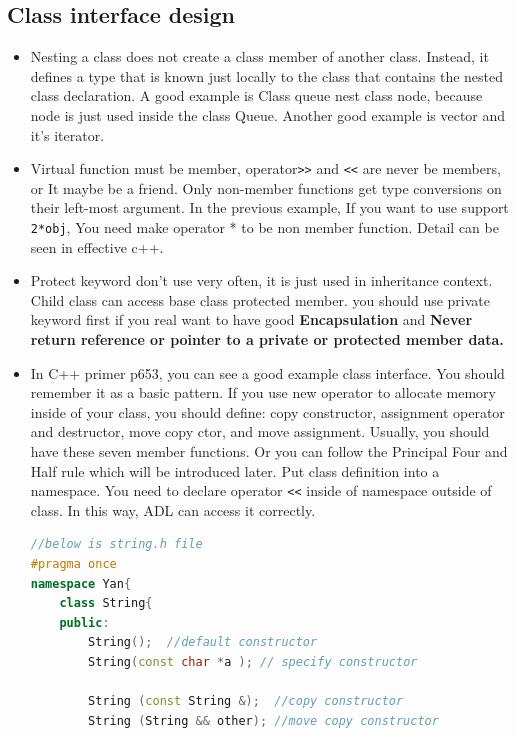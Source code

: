\documentclass[a4paper,11pt,twoside]{book}
\begin{document}
\subsection{Class interface design}
\begin{itemize}
	
	\item Nesting a class does not create a class member of another class. Instead, it defines a type that is known just locally to the class that contains the nested class declaration.  A good example is Class queue nest class node,  because node is just used inside the class Queue. Another good example is vector and it's iterator.
	
	\item Virtual function must be member, operator\verb=>>= and \verb=<<= are never be members, or It maybe be a friend. Only non-member functions get type conversions on their left-most argument.  In the previous example, If you want to use support \texttt{2*obj}, You need make operator * to be non member function.  Detail can be seen in effective c++.
	
	\item Protect keyword don't use very often, it is just used in inheritance context. Child class can access base class protected member. you should use private keyword first if you real want to have good \textbf{Encapsulation} and \textbf{Never return reference or pointer to a private or protected member data.}
	
	\item In C++ primer p653, you can see a good example class interface. You should remember it as a basic pattern.  If you use new operator to allocate memory inside of your class, you should define: copy constructor, assignment operator and destructor, move copy ctor, and move assignment. Usually, you should have these seven member functions. Or you can follow the Principal Four and Half rule which will be introduced later.  Put class definition into a namespace. You need to declare operator \verb=<<= inside of namespace outside of class. In this way, ADL can access it correctly.
	
\begin{lstlisting}[frame=single, language=c++]
//below is string.h file
#pragma once
namespace Yan{
	class String{
	public:
		String();  //default constructor
		String(const char *a ); // specify constructor
		
		String (const String &);  //copy constructor
		String (String && other); //move copy constructor
		

\end{lstlisting}
\end{itemize}
\end{document}
